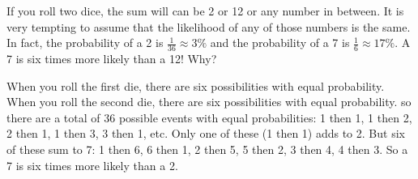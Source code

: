 If you roll two dice, the sum will can be 2 or 12 or any number in
between. It is very tempting to assume that the likelihood of any of
those numbers is the same. In fact, the probability of a 2 is
$\frac{1}{36} \approx 3\%$ and the probability of a 7 is $\frac{1}{6}
\approx 17\%$. A 7 is six times more likely than a 12! Why?

When you roll the first die, there are six possibilities with equal
probability. When you roll the second die, there are six possibilities
with equal probability. so there are a total of 36 possible events
with equal probabilities: 1 then 1, 1 then 2, 2 then 1, 1 then 3, 3
then 1, etc. Only one of these (1 then 1) adds to 2.  But six of these
sum to 7: 1 then 6, 6 then 1, 2 then 5, 5 then 2, 3 then 4, 4 then
3. So a 7 is six times more likely than a 2.


